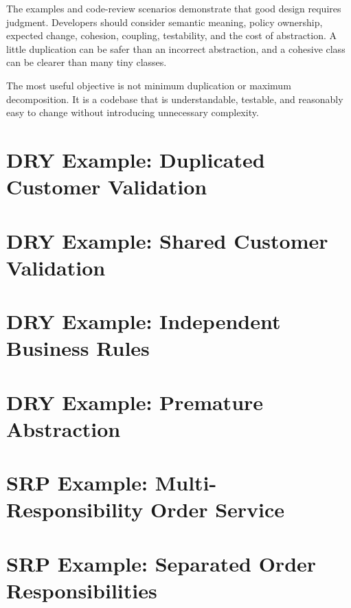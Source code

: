 \documentclass[12pt,a4paper]{article}
\begin{document}
The examples and code-review scenarios demonstrate that good design requires judgment. Developers should consider semantic meaning, policy ownership, expected change, cohesion, coupling, testability, and the cost of abstraction. A little duplication can be safer than an incorrect abstraction, and a cohesive class can be clearer than many tiny classes.

The most useful objective is not minimum duplication or maximum decomposition. It is a codebase that is understandable, testable, and reasonably easy to change without introducing unnecessary complexity.

\printbibliography[heading=bibintoc,title={References}]
\appendix
\section{DRY Example: Duplicated Customer Validation}

\section{DRY Example: Shared Customer Validation}

\section{DRY Example: Independent Business Rules}

\section{DRY Example: Premature Abstraction}

\section{SRP Example: Multi-Responsibility Order Service}

\section{SRP Example: Separated Order Responsibilities}

\end{document}
